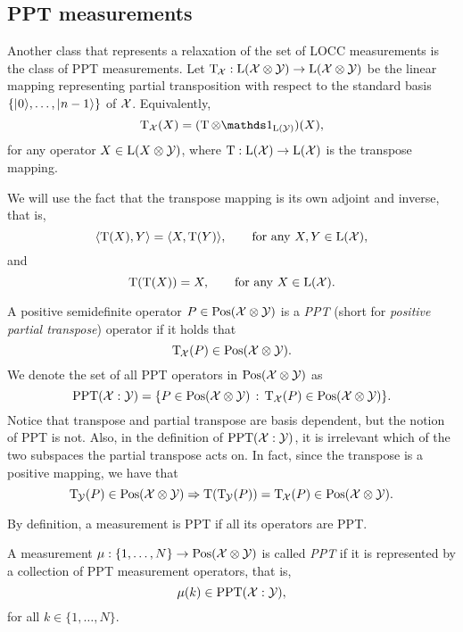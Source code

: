 \subsection{PPT measurements}
\label{sec:ppt-measurements}

Another class that represents a relaxation of the set of LOCC measurements is 
the class of PPT measurements.
Let $\operatorname{T}_{\mspace{-1.5mu}\mathcal{X}}:\mathrm{L}(\mathcal{X}\otimes\mathcal{Y})\rightarrow\mathrm{L}(\mathcal{X}\otimes\mathcal{Y})$ be
the linear mapping representing partial transposition with respect to the
standard basis $\{\lvert\mspace{0.5mu} 0 \mspace{0.5mu} \rangle,\ldots,\lvert\mspace{0.5mu} n-1 \mspace{0.5mu} \rangle\}$ of $\mathcal{X}$. Equivalently,
\begin{equation}
  \pt_{\X}(X) = (\pt\otimes\I_{\Lin(\Y)})(X),
\end{equation}
for any operator $X\in\mathrm{L}(X\otimes\mathcal{Y})$, where $\operatorname{T}:\mathrm{L}(\mathcal{X})\to\mathrm{L}(\mathcal{X})$
is the transpose mapping.

We will use the fact that the transpose mapping is its own adjoint and inverse, that is,
\begin{equation}
  \langle \operatorname{T}(X) , Y\rangle = \langle X , \operatorname{T}(Y)\rangle, \qquad\mbox{for any }X,Y\in\mathrm{L}(\mathcal{X}),
\end{equation}
and 
\begin{equation}
  \operatorname{T}(\operatorname{T}(X)) = X,\qquad\mbox{for any }X\in\mathrm{L}(\mathcal{X}).
\end{equation}

A positive semidefinite operator $P\in \mathrm{Pos}(\mathcal{X}\otimes\mathcal{Y})$ is a \emph{PPT}
(short for \emph{positive partial transpose}) operator if it holds that
\begin{equation}
  \operatorname{T}_{\mspace{-1.5mu}\mathcal{X}}(P) \in \mathrm{Pos}(\mathcal{X}\otimes\mathcal{Y}).
\end{equation}
We denote the set of all PPT operators in $\mathrm{Pos}(\mathcal{X}\otimes\mathcal{Y})$ as 
\begin{equation}
\mathrm{PPT}(\mathcal{X}:\mathcal{Y}) = \{ P \in \mathrm{Pos}(\mathcal{X}\otimes\mathcal{Y}) \,:\,
    \operatorname{T}_{\mathcal{X}}(P) \in \mathrm{Pos}(\mathcal{X}\otimes\mathcal{Y}) \}.
\end{equation}
Notice that transpose and partial transpose are basis dependent, but the notion of PPT
is not. Also, in the definition of $\mathrm{PPT}(\mathcal{X}:\mathcal{Y})$, it is irrelevant which of the two subspaces the partial transpose acts on. In fact, since the transpose is a positive mapping, we have that
\begin{equation}
  \operatorname{T}_{\mspace{-1.5mu}\mathcal{Y}}(P) \in \mathrm{Pos}(\mathcal{X}\otimes\mathcal{Y})\Rightarrow
  \operatorname{T}(\operatorname{T}_{\mspace{-1.5mu}\mathcal{Y}}(P)) = \operatorname{T}_{\mspace{-1.5mu}\mathcal{X}}(P) 
    \in \mathrm{Pos}(\mathcal{X}\otimes\mathcal{Y}).
\end{equation}

By definition, a measurement is PPT if all its operators are PPT.  
\begin{definition}
\label{def:ppt-measurements}
A measurement $\mu : \{1, \ldots, N\}\rightarrow\mathrm{Pos}(\mathcal{X}\otimes\mathcal{Y})$ is called 
\emph{PPT} if it is represented by a collection
of PPT measurement operators, that is,
\begin{equation}
\mu(k) \in \mathrm{PPT}(\mathcal{X}:\mathcal{Y}),
\end{equation}
for all $k \in \{1,\ldots,N\}$.
\end{definition}

